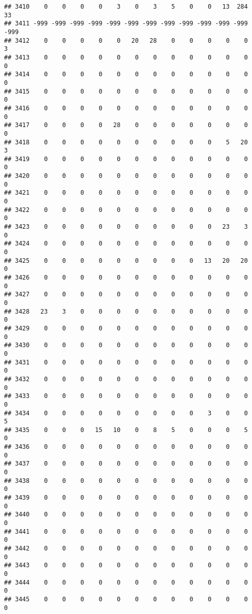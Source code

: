 \documentclass[]{article}
\begin{document}
\begin{verbatim}
## 3410    0    0    0    0    3    0    3    5    0    0   13  284   33
## 3411 -999 -999 -999 -999 -999 -999 -999 -999 -999 -999 -999 -999 -999
## 3412    0    0    0    0    0   20   28    0    0    0    0    0    3
## 3413    0    0    0    0    0    0    0    0    0    0    0    0    0
## 3414    0    0    0    0    0    0    0    0    0    0    0    0    0
## 3415    0    0    0    0    0    0    0    0    0    0    0    0    0
## 3416    0    0    0    0    0    0    0    0    0    0    0    0    0
## 3417    0    0    0    0   28    0    0    0    0    0    0    0    0
## 3418    0    0    0    0    0    0    0    0    0    0    5   20    3
## 3419    0    0    0    0    0    0    0    0    0    0    0    0    0
## 3420    0    0    0    0    0    0    0    0    0    0    0    0    0
## 3421    0    0    0    0    0    0    0    0    0    0    0    0    0
## 3422    0    0    0    0    0    0    0    0    0    0    0    0    0
## 3423    0    0    0    0    0    0    0    0    0    0   23    3    0
## 3424    0    0    0    0    0    0    0    0    0    0    0    0    0
## 3425    0    0    0    0    0    0    0    0    0   13   20   20    0
## 3426    0    0    0    0    0    0    0    0    0    0    0    0    0
## 3427    0    0    0    0    0    0    0    0    0    0    0    0    0
## 3428   23    3    0    0    0    0    0    0    0    0    0    0    0
## 3429    0    0    0    0    0    0    0    0    0    0    0    0    0
## 3430    0    0    0    0    0    0    0    0    0    0    0    0    0
## 3431    0    0    0    0    0    0    0    0    0    0    0    0    0
## 3432    0    0    0    0    0    0    0    0    0    0    0    0    0
## 3433    0    0    0    0    0    0    0    0    0    0    0    0    0
## 3434    0    0    0    0    0    0    0    0    0    3    0    0    5
## 3435    0    0    0   15   10    0    8    5    0    0    0    5    0
## 3436    0    0    0    0    0    0    0    0    0    0    0    0    0
## 3437    0    0    0    0    0    0    0    0    0    0    0    0    0
## 3438    0    0    0    0    0    0    0    0    0    0    0    0    0
## 3439    0    0    0    0    0    0    0    0    0    0    0    0    0
## 3440    0    0    0    0    0    0    0    0    0    0    0    0    0
## 3441    0    0    0    0    0    0    0    0    0    0    0    0    0
## 3442    0    0    0    0    0    0    0    0    0    0    0    0    0
## 3443    0    0    0    0    0    0    0    0    0    0    0    0    0
## 3444    0    0    0    0    0    0    0    0    0    0    0    0    0
## 3445    0    0    0    0    0    0    0    0    0    0    0    0    0

\end{verbatim}
\end{document}
